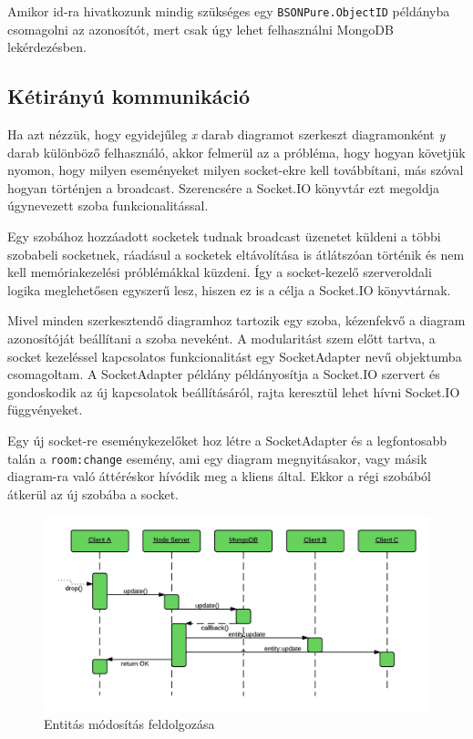 Amikor id-ra hivatkozunk mindig szükséges egy \lstinline{BSONPure.ObjectID} példányba csomagolni az azonosítót, mert csak úgy lehet felhasználni MongoDB lekérdezésben.

\subsection{Kétirányú kommunikáció}

Ha azt nézzük, hogy egyidejűleg \emph{x} darab diagramot szerkeszt diagramonként \emph{y} darab különböző felhasználó, akkor felmerül az a próbléma, hogy hogyan követjük nyomon, hogy milyen eseményeket milyen socket-ekre kell továbbítani, más szóval hogyan történjen a broadcast. Szerencsére a Socket.IO könyvtár ezt megoldja úgynevezett szoba funkcionalitással.

 Egy szobához hozzáadott socketek tudnak broadcast üzenetet küldeni a többi szobabeli socketnek, ráadásul a socketek eltávolítása is átlátszóan történik és nem kell memóriakezelési próblémákkal küzdeni. Így a socket-kezelő szerveroldali logika meglehetősen egyszerű lesz, hiszen ez is a célja a Socket.IO könyvtárnak. 

Mivel minden szerkesztendő diagramhoz tartozik egy szoba, kézenfekvő a diagram azonosítóját beállítani a szoba neveként. A modularitást szem előtt tartva, a socket kezeléssel kapcsolatos funkcionalitást egy SocketAdapter nevű objektumba csomagoltam. A SocketAdapter példány példányosítja a Socket.IO szervert és gondoskodik az új kapcsolatok beállításáról, rajta keresztül lehet hívni Socket.IO függvényeket.

Egy új socket-re eseménykezelőket hoz létre a SocketAdapter és a legfontosabb talán a \lstinline{room:change} esemény, ami egy diagram megnyitásakor, vagy másik diagram-ra való áttéréskor hívódik meg a kliens által. Ekkor a régi szobából átkerül az új szobába a socket. 

\begin{figure}[!ht]
\centering
\includegraphics[width=15cm,keepaspectratio]{figures/collaboration-seq.png}
\caption{Entitás módosítás feldolgozása}
\label{fig:entityupdate}
\end{figure}


